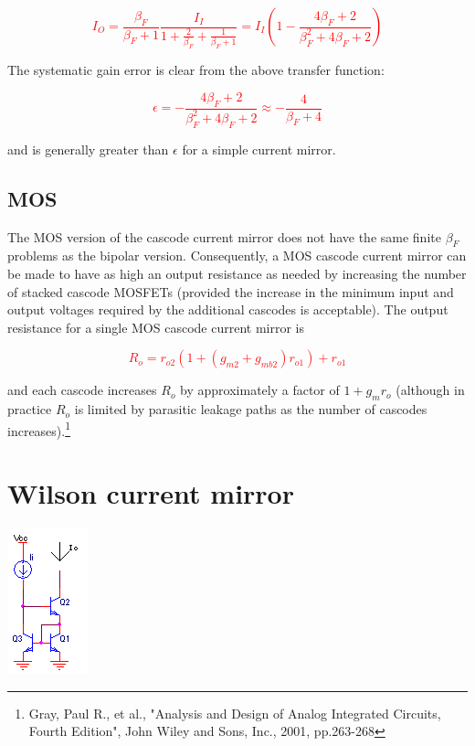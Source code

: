 \textcolor{red}{
\begin{equation}
I_{O} = \frac{\beta_{F}}{\beta_{F} + 1}\frac{I_{I}}{1+ \frac{2}{\beta_{F}} + \frac{1}{\beta_{F} + 1}} = I_{I}\left(1-\frac{4\beta_{F} + 2}{\beta_{F}^{2} + 4\beta_{F} + 2}\right)
\end{equation}
}

\par The systematic gain error is clear from the above transfer function:

\textcolor{red}{
\begin{equation}
\epsilon = -\frac{4\beta_{F} +  2}{\beta_{F}^{2} + 4\beta_{F} + 2} \approx -\frac{4}{\beta_{F} + 4}
\end{equation}
}

and is generally greater than $\epsilon$ for a simple current mirror.
\subsection{MOS}
The MOS version of the cascode current mirror does not have the same finite $\beta_{F}$ problems as the bipolar version. Consequently, a MOS cascode current mirror can be made to have as high an output resistance as needed by increasing the number of stacked cascode MOSFETs (provided the increase in the minimum input and output voltages required by the additional cascodes is acceptable). The output resistance for a single MOS cascode current mirror is

\textcolor{red}{
\begin{equation}
R_{o} = r_{o2}(1+(g_{m2}+g_{mb2})r_{o1})+ r_{o1}
\end{equation}
}

and each cascode increases $R_{o}$ by approximately a factor of $1+g_{m}r_{o}$ (although in practice $R_{o}$ is limited by parasitic leakage paths as the number of cascodes increases).\footnote{Gray, Paul R., et al., "Analysis and Design of Analog Integrated Circuits, Fourth Edition", John Wiley and Sons, Inc., 2001, pp.263-268}

\section{Wilson current mirror}
\begin{center}
	\includegraphics{schematics/wilsoncurrentmirror.PNG}
\end{center}


